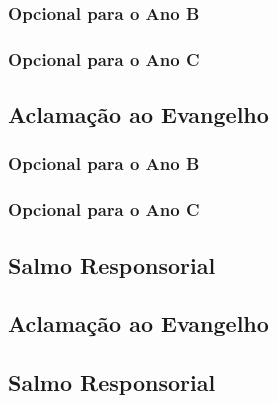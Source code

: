 \AllowPageFlush

\subsubsection{Opcional para o Ano B}

\AllowPageFlush

\subsubsection{Opcional para o Ano C}

\AllowPageFlush

\subsection{Aclamação ao Evangelho}\label{subsection:natal/sagrada-familia/aclamacao}

\subsubsection{Opcional para o Ano B}

\subsubsection{Opcional para o Ano C}

\AllowPageFlush

\label{section:natal/santa-maria-mae-de-deus}

\subsection{Salmo Responsorial}\label{subsection:natal/santa-maria-mae-de-deus/salmo-responsorial}

\subsection{Aclamação ao Evangelho}\label{subsection:natal/santa-maria-mae-de-deus/aclamacao}

\label{section:natal/epifania}

\subsection{Salmo Responsorial}\label{subsection:natal/epifania/salmo-responsorial}


